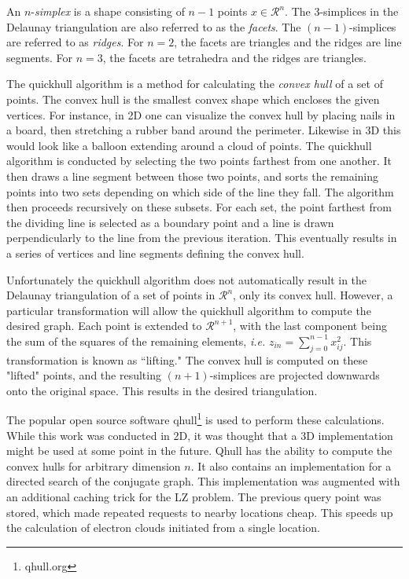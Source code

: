 An $n$-\textit{simplex} is a shape consisting of $n-1$ points   $x \in \mathcal{R}^n$. 
The 3-simplices in the Delaunay triangulation are also referred to as the \textit{facets}. 
The $(n-1)$-simplices are referred to as \textit{ridges}.
For $n=2$, the facets are triangles and the ridges are line segments.
For $n=3$, the facets are tetrahedra and the ridges are triangles.

The quickhull algorithm is a method for calculating the \textit{convex hull} of a set of points.
The convex hull is the smallest convex shape which encloses the given vertices.
For instance, in 2D one can visualize the convex hull by placing nails in a board, then stretching a rubber band around the perimeter.
Likewise in 3D this would look like a balloon extending around a cloud of points.
The quickhull algorithm is conducted by selecting the two points farthest from one another.
It then draws a line segment between those two points, and sorts the remaining points into two sets depending on which side of the line they fall. 
The algorithm then proceeds recursively on these subsets.
For each set, the point farthest from the dividing line is selected as a boundary point and a line is drawn perpendicularly to the line from the previous iteration.
This eventually results in a series of vertices and line segments defining the convex hull.

Unfortunately the quickhull algorithm does not automatically result in the Delaunay triangulation of a set of points in $\mathcal{R}^n$, only its convex hull.
However, a particular transformation will allow the quickhull algorithm to compute the desired graph.
Each point is extended to $\mathcal{R}^{n+1}$, with the last component being the sum of the squares of the remaining elements, \textit{i.e.} $z_{in} = \sum_{j=0}^{n-1}x_{ij}^2$.
This transformation is known as ``lifting."
The convex hull is computed on these "lifted" points, and the resulting $(n+1)$-simplices are projected downwards onto the original space.
This results in the desired triangulation.

The popular open source software qhull\footnote{qhull.org} is used to perform these calculations.
While this work was conducted in 2D, it was thought that a 3D implementation might be used at some point in the future. 
Qhull has the ability to compute the convex hulls for arbitrary dimension $n$.
It also contains an implementation for a directed search of the conjugate graph.
This implementation was augmented with an additional caching trick for the LZ problem.
The previous query point was stored, which made repeated requests to nearby locations cheap. 
This speeds up the calculation of electron clouds initiated from a single location.


